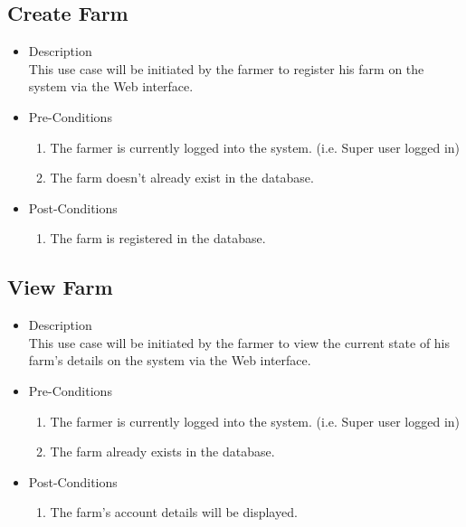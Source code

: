\documentclass[11pt,fleqn]{book} %
\begin{document}
		\subsection{Create Farm}
		\begin{itemize}
			\item Description\\
			This use case will be initiated by the farmer to register his farm on the system via the Web interface.
			\item Pre-Conditions
			\begin{enumerate}
				\item The farmer is currently logged into the system. (i.e. Super user logged in)
				\item The farm doesn’t already exist in the database.
			\end{enumerate}
			\item Post-Conditions
			\begin{enumerate}
				\item The farm is registered in the database.
			\end{enumerate}
		\end{itemize}
		
		\subsection{View Farm}
		\begin{itemize}
			\item Description\\
			This use case will be initiated by the farmer to view the current state of his farm’s details on the system via the Web interface.
			\item Pre-Conditions
			\begin{enumerate}
				\item The farmer is currently logged into the system. (i.e. Super user logged in)
				\item The farm already exists in the database.					
			\end{enumerate}
			\item Post-Conditions
			\begin{enumerate}
				\item The farm’s account details will be displayed.
			\end{enumerate}
		\end{itemize}
		
\end{document}
